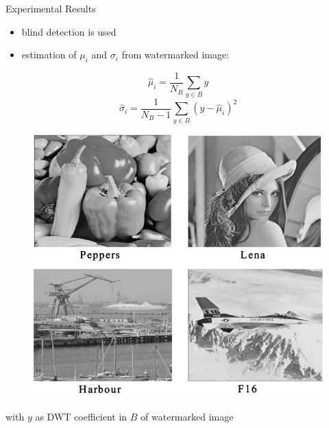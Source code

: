 \begin{frame}{Experimental Results}
	\begin{minipage}{0.54\textwidth}
	\begin{itemize}
	\item blind detection is used
	\item estimation of $\mu_i$ and $\sigma_i$ from watermarked image:
	\end{itemize}
$$\hat{\mu}_i = \frac{1}{N_B} \sum_{y \in B}y$$
	$$\hat{\sigma}_i = \frac{1}{N_B - 1} \sum_{y\in B}(y-\hat{\mu}_i)^2$$ 
	\end{minipage} 
	\begin{minipage}{0.44\textwidth}
	\begin{figure}
	\centering
	\includegraphics[width=\textwidth]{Bilder/ResultsBilder} 
	\end{figure}
	\end{minipage} 	
	with $y$ as DWT coefficient in $B$ of watermarked image
\end{frame}